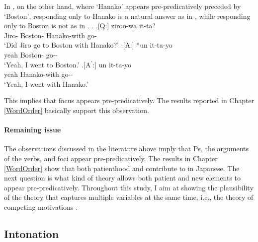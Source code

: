 In \Next,
on the other hand,
where `Hanako' appears pre-predicatively preceded by `Boston',
responding only to Hanako is a natural answer as in \Next[A$^{\prime}$],
while responding only to Boston is not as in \Next[A].
%
\ex.
 \a.[Q:] ziroo-wa   it-ta? \\
         Jiro- Boston- Hanako-with go- \\
         `Did Jiro go to Boston with Hanako?'
 \bg.[A:] *un  it-ta-yo \\
           yeah Boston- go-- \\
           `Yeah, I went to Boston.'
 \bg.[A$^{\prime}$:] un  it-ta-yo \\
           yeah Hanako-with go-- \\
           `Yeah, I went with Hanako.'
           \hfill{\cite[54]{kuno78}}

This implies that focus appears pre-predicatively.
The results reported in Chapter \ref{WordOrder} basically support this observation.

\paragraph{Remaining issue}

The observations discussed in the literature above imply that
Ps, the arguments of the  verbs, and foci appear pre-predicatively.
The results in Chapter \ref{WordOrder} show that both patienthood and  contribute to  in Japanese.
The next question is what kind of theory allows both patient and new elements to appear pre-predicatively.
Throughout this study,
I aim at showing the plausibility of the theory that captures multiple variables at the same time, i.e., the theory of competing motivations \cite{dubois85}.



\subsection{Intonation}\label{BackSubIntonation}

